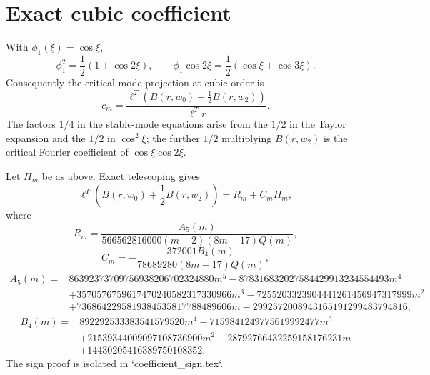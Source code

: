 \section*{Exact cubic coefficient}
With $\phi_1(\xi)=\cos\xi$,
\[
\phi_1^2=\frac12(1+\cos2\xi),
\qquad
\phi_1\cos2\xi=\frac12(\cos\xi+\cos3\xi).
\]
Consequently the critical-mode projection at cubic order is
\[
c_m=\frac{\ell^T\left(B(r,w_0)+\tfrac12B(r,w_2)\right)}{\ell^Tr}.
\]
The factors $1/4$ in the stable-mode equations arise from the $1/2$ in the
Taylor expansion and the $1/2$ in $\cos^2\xi$; the further $1/2$ multiplying
$B(r,w_2)$ is the critical Fourier coefficient of
$\cos\xi\cos2\xi$.

Let $H_m$ be as above.  Exact telescoping gives
\[
\ell^T\left(B(r,w_0)+\frac12B(r,w_2)\right)=R_m+C_mH_m,
\]
where
\[
R_m=\frac{A_5(m)}{566562816000(m-2)(8m-17)Q(m)},
\]
\[
C_m=-\frac{372001B_4(m)}{78689280(8m-17)Q(m)},
\]
\begin{align*}
A_5(m)={}&86392373709756938206702324880m^5
-878316832027584429913234554493m^4\\
&+3570576759617470240582317330966m^3
-7255203323904441261456947317999m^2\\
&+7368642295819384535817788489606m
-2992572008943165191299483794816,
\end{align*}
\begin{align*}
B_4(m)={}&892292533383541579520m^4
-7159841249775619992477m^3\\
&+21539344009097108736900m^2
-28792766432259158176231m\\
&+14430205416389750108352.
\end{align*}
The sign proof is isolated in `coefficient_sign.tex`.
